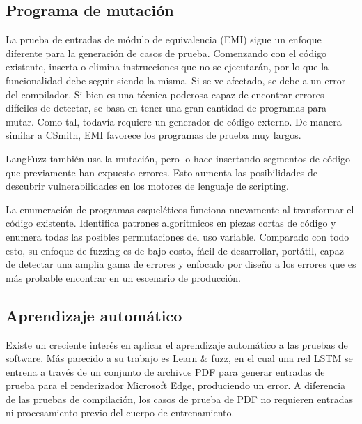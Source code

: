 \subsection{Programa de mutación}
La prueba de entradas de módulo de equivalencia (EMI)\cite{Le:Afshari:Su:Modulo}\cite{Sun:Le:Su:Mutation} sigue un enfoque diferente para la generación de casos de prueba. Comenzando con el código existente, inserta o elimina instrucciones que no se ejecutarán, por lo que la funcionalidad debe seguir siendo la misma. Si se ve afectado, se debe a un error del compilador. Si bien es una técnica poderosa capaz de encontrar errores difíciles de detectar, se basa en tener una gran cantidad de programas para mutar. Como tal, todavía requiere un generador de código externo. De manera similar a CSmith, EMI favorece los programas de prueba muy largos.

LangFuzz\cite{Holler:Herzig:Zeller:Fragments} también usa la mutación, pero lo hace insertando segmentos de código que previamente han expuesto errores. Esto aumenta las posibilidades de descubrir vulnerabilidades en los motores de lenguaje de scripting.

La enumeración de programas esqueléticos\cite{Zhang:Sun:Su:Skeletal} funciona nuevamente al transformar el código existente. Identifica patrones algorítmicos en piezas cortas de código y enumera todas las posibles permutaciones del uso variable. Comparado con todo esto, su enfoque de fuzzing es de bajo costo, fácil de desarrollar, portátil, capaz de detectar una amplia gama de errores y enfocado por diseño a los errores que es más probable encontrar en un escenario de producción.

\subsection{Aprendizaje automático}
Existe un creciente interés en aplicar el aprendizaje automático a las pruebas de software. Más parecido a su trabajo es Learn \& fuzz\cite{Godefroid:Peleg:Singh:LearnAndFuzz}, en el cual una red LSTM se entrena a través de un conjunto de archivos PDF para generar entradas de prueba para el renderizador Microsoft Edge, produciendo un error. A diferencia de las pruebas de compilación, los casos de prueba de PDF no requieren entradas ni procesamiento previo del cuerpo de entrenamiento.

